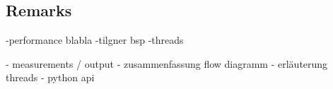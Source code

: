 \subsection{Remarks}

-performance blabla
-tilgner bsp
-threads

- measurements / output
- zusammenfassung flow diagramm
- erläuterung threads
- python api



